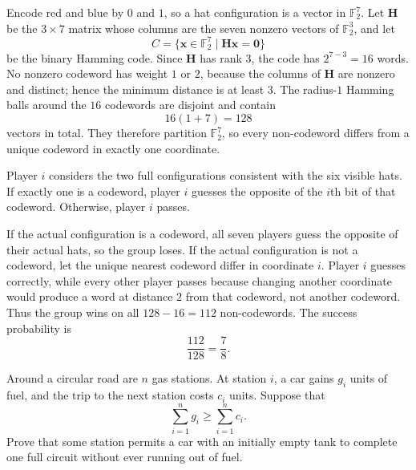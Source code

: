     \begin{solution}
        Encode red and blue by $0$ and $1$, so a hat configuration is a vector
        in $\mathbb{F}_2^7$. Let $\mathbf{H}$ be the $3\times7$ matrix whose
        columns are the seven nonzero vectors of $\mathbb{F}_2^3$, and let
        \[
            C=\{\mathbf{x}\in\mathbb{F}_2^7\mid
            \mathbf{H}\mathbf{x}=\mathbf{0}\}
        \]
        be the binary Hamming code. Since $\mathbf{H}$ has rank $3$, the code
        has $2^{7-3}=16$ words. No nonzero codeword has weight $1$ or $2$,
        because the columns of $\mathbf{H}$ are nonzero and distinct; hence the
        minimum distance is at least $3$. The radius-$1$ Hamming balls around
        the $16$ codewords are disjoint and contain
        \[
            16(1+7)=128
        \]
        vectors in total. They therefore partition $\mathbb{F}_2^7$, so every
        non-codeword differs from a unique codeword in exactly one coordinate.

        Player $i$ considers the two full configurations consistent with the
        six visible hats. If exactly one is a codeword, player $i$ guesses the
        opposite of the $i$th bit of that codeword. Otherwise, player $i$
        passes.

        If the actual configuration is a codeword, all seven players guess the
        opposite of their actual hats, so the group loses. If the actual
        configuration is not a codeword, let the unique nearest codeword differ
        in coordinate $i$. Player $i$ guesses correctly, while every other
        player passes because changing another coordinate would produce a word
        at distance $2$ from that codeword, not another codeword. Thus the group
        wins on all $128-16=112$ non-codewords. The success probability is
        \[
            \boxed{\frac{112}{128}=\frac78}.
        \]
    \end{solution}

    \begin{expectedproblem}
        Around a circular road are $n$ gas stations. At station $i$, a car gains
        $g_i$ units of fuel, and the trip to the next station costs $c_i$ units.
        Suppose that
        \[
            \sum_{i=1}^{n}g_i
            \geq
            \sum_{i=1}^{n}c_i.
        \]
        Prove that some station permits a car with an initially empty tank to
        complete one full circuit without ever running out of fuel.
    \end{expectedproblem}

